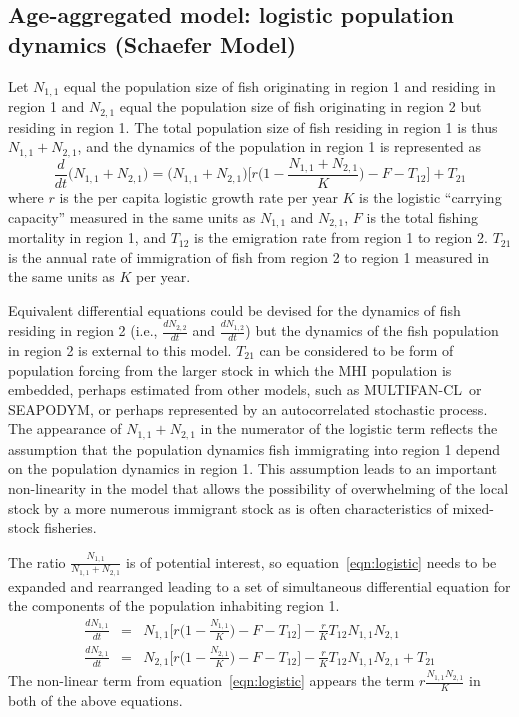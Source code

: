 \documentclass[12pt,letterpaper]{article}
\newcommand\SD{SEAPODYM}
\newcommand\MFCL{MULTIFAN-CL}
\newcommand\None{{N_{1,1}}}
\newcommand\Ntwo{{N_{2,1}}}
\newcommand\Nsum{{N_{1,1}+N_{2,1}}}
\begin{document}
\subsection*{Age-aggregated model: logistic population dynamics (Schaefer Model)}

Let $\None$ equal the population size of fish originating in region 1
and residing in region 1
and $\Ntwo$ equal the population size of fish originating in region 2
but residing in region 1.
The total population size of fish residing in region 1 is thus
$\Nsum$, and the dynamics of the population in region 1 is represented as
\begin{equation}
\frac{d}{dt}\big(\Nsum\big)=\big(\Nsum\big)\Big[r\Big(1-\frac{\Nsum}{K}\Big)-F-T_{12}\Big]+T_{21}
\label{eqn:logistic}
\end{equation}
where $r$ is the per capita logistic growth rate per year $K$ is the
logistic ``carrying capacity'' measured in the same units as $\None$
and $\Ntwo$, $F$ is the total fishing mortality in region 1, and $T_{12}$
is the emigration rate from region 1 to region 2. $T_{21}$
is the annual rate of immigration of fish from region 2 to region 1
measured in the same units as $K$ per year.

Equivalent differential equations could be devised for the dynamics of
fish residing in region 2 (i.e., $\frac{dN_{2,2}}{dt}$ and
$\frac{dN_{1,2}}{dt}$) but 
the dynamics of the fish population in region 2 is external to this
model. $T_{21}$ can be considered to be form of population forcing
from the larger stock in which the MHI population is embedded, perhaps
estimated from other models, such as \MFCL\ or \SD, or perhaps
represented by an
autocorrelated stochastic process. The appearance of
$\Nsum$ in the numerator of the logistic term reflects the assumption
that the population dynamics fish immigrating into region 1 depend on
the population dynamics in region 1. This assumption leads to an
important non-linearity in the model that allows the possibility of
overwhelming of the
local stock by a more numerous immigrant stock as is often characteristics of
mixed-stock fisheries.

The ratio $\frac{\None}{\Nsum}$ is of potential interest, so
equation~\ref{eqn:logistic} needs to be expanded and rearranged
leading to a set of simultaneous differential equation for the
components of the population inhabiting region 1.
\begin{eqnarray}
\frac{d\None}{dt}&=&\None\Big[r\Big(1-\frac{\None}{K}\Big)
-F - T_{12}\Big] - \frac{r}{K}T_{12}\None\Ntwo\nonumber\\
\frac{d\Ntwo}{dt}&=&\Ntwo\Big[r\Big(1-\frac{\Ntwo}{K}\Big)
-F - T_{12}\Big] - \frac{r}{K}T_{12}\None\Ntwo + T_{21}
\label{eqn:coupledschaefer}
\end{eqnarray}
The non-linear term from equation~\ref{eqn:logistic} appears the term
$r\frac{\None\Ntwo}{K}$ in both of the above equations.
\end{document}
